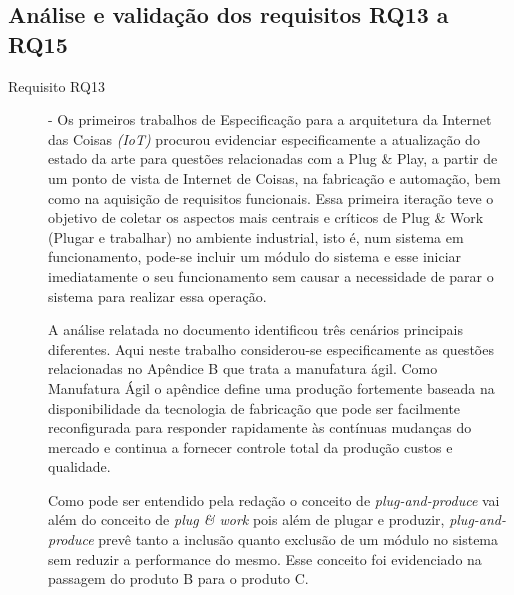\begin{description}
\end{description}	

\subsection{Análise e validação dos requisitos RQ13 a RQ15}	
				
\begin{description}
	\item[Requisito RQ13] - Os primeiros trabalhos de Especificação para a arquitetura da Internet das Coisas \textit{(IoT)} procurou evidenciar especificamente a atualização do estado da arte para questões relacionadas com a Plug \& Play, a partir de um ponto de vista de Internet de Coisas, na fabricação e automação, bem como na aquisição de requisitos funcionais. Essa primeira iteração teve o objetivo de coletar os aspectos mais centrais e críticos de Plug \& Work (Plugar e trabalhar) no ambiente industrial, isto é, num sistema em funcionamento, pode-se incluir um módulo do sistema e esse iniciar imediatamente o seu funcionamento sem causar a necessidade de parar o sistema para realizar essa operação. \par 
	
	A análise relatada  no documento identificou três cenários principais diferentes. Aqui neste trabalho considerou-se especificamente as questões relacionadas no Apêndice B que trata a manufatura ágil. Como Manufatura Ágil o apêndice define uma produção fortemente baseada na disponibilidade da tecnologia de fabricação que pode ser facilmente reconfigurada para responder rapidamente às contínuas mudanças do mercado e continua a fornecer controle total da produção custos e qualidade. \par 
	Como pode ser entendido pela redação o conceito de \textit{plug-and-produce} vai além do conceito de \textit{plug \& work} pois além de plugar e produzir, \textit{plug-and-produce} prevê tanto a inclusão quanto  exclusão de um módulo no sistema sem reduzir a performance do mesmo. Esse conceito foi evidenciado na passagem do produto B para o produto C.	
	

\end{description}
